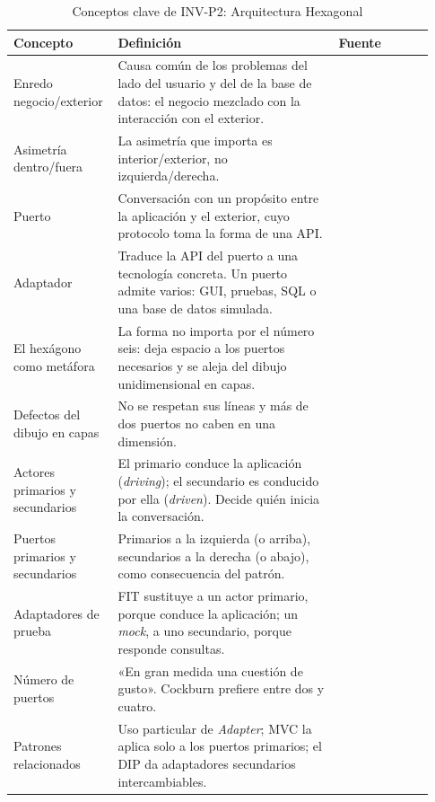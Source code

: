 \begin{table}[htbp]
  \centering
  \small
  \caption{Conceptos clave de INV-P2: Arquitectura Hexagonal}
  \label{tab:inv-p2-hexagonal}
  \begin{tabular}{@{}p{0.2\linewidth}p{0.51\linewidth}p{0.22\linewidth}@{}}
    \toprule
    Concepto & Definición & Fuente \\
    \midrule
    \raggedright Enredo negocio/exterior & Causa común de los problemas del lado del usuario y del de la base de datos: el negocio mezclado con la interacción con el exterior. & \raggedright \citep[«Motivation»; «Nature of the Solution»]{cockburn2005} \tabularnewline
    \raggedright Asimetría dentro/fuera & La asimetría que importa es interior/exterior, no izquierda/derecha. & \raggedright \citep[«Nature of the Solution»]{cockburn2005} \tabularnewline
    \raggedright Puerto & Conversación con un propósito entre la aplicación y el exterior, cuyo protocolo toma la forma de una API. & \raggedright \citep[«Nature of the Solution»]{cockburn2005} \tabularnewline
    \raggedright Adaptador & Traduce la API del puerto a una tecnología concreta. Un puerto admite varios: GUI, pruebas, SQL o una base de datos simulada. & \raggedright \citep[«Nature of the Solution»]{cockburn2005} \tabularnewline
    \raggedright El hexágono como metáfora & La forma no importa por el número seis: deja espacio a los puertos necesarios y se aleja del dibujo unidimensional en capas. & \raggedright \citep[«Nature of the Solution»]{cockburn2005} \tabularnewline
    \raggedright Defectos del dibujo en capas & No se respetan sus líneas y más de dos puertos no caben en una dimensión. & \raggedright \citep[«Nature of the Solution»]{cockburn2005} \tabularnewline
    \raggedright Actores primarios y secundarios & El primario conduce la aplicación (\emph{driving}); el secundario es conducido por ella (\emph{driven}). Decide quién inicia la conversación. & \raggedright \citep[«The Left-Right Asymmetry»]{cockburn2005} \tabularnewline
    \raggedright Puertos primarios y secundarios & Primarios a la izquierda (o arriba), secundarios a la derecha (o abajo), como consecuencia del patrón. & \raggedright \citep[«The Left-Right Asymmetry»]{cockburn2005} \tabularnewline
    \raggedright Adaptadores de prueba & FIT sustituye a un actor primario, porque conduce la aplicación; un \emph{mock}, a uno secundario, porque responde consultas. & \raggedright \citep[«The Left-Right Asymmetry»]{cockburn2005} \tabularnewline
    \raggedright Número de puertos & «En gran medida una cuestión de gusto». Cockburn prefiere entre dos y cuatro. & \raggedright \citep[«How Many Ports?»]{cockburn2005} \tabularnewline
    \raggedright Patrones relacionados & Uso particular de \emph{Adapter}; MVC la aplica solo a los puertos primarios; el DIP da adaptadores secundarios intercambiables. & \raggedright \citep[«Related Patterns»]{cockburn2005} \tabularnewline
    \bottomrule
  \end{tabular}
\end{table}

